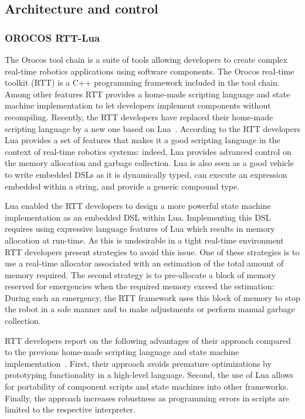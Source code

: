 \subsection{Architecture and control}

\subsubsection{OROCOS RTT-Lua}

The Orocos tool chain is a suite of tools allowing developers to
create complex real-time robotics applications using software
components. The Orocos real-time toolkit (RTT) is a C++ programming
framework included in the tool chain. Among other features RTT
provides a home-made scripting language and state machine
implementation to let developers implement components without
recompiling. Recently, the RTT developers have replaced their
home-made scripting language by a new one based on
Lua~\cite{Klotzbucher:2010fk}. According to the RTT developers Lua
provides a set of features that makes it a good scripting language in
the context of real-time robotics systems: indeed, Lua provides
advanced control on the memory allocation and garbage collection. Lua
is also seen as a good vehicle to write embedded DSLs as it is
dynamically typed, can execute an expression embedded within a string,
and provide a generic compound type.

Lua enabled the RTT developers to design a more powerful state machine
implementation as an embedded DSL within Lua. Implementing this DSL
requires using expressive language features of Lua which results in
memory allocation at run-time. As this is undesirable in a tight
real-time environment RTT developers present strategies to avoid this
issue. One of these strategies is to use a real-time allocator
associated with an estimation of the total amount of memory required.
The second strategy is to pre-allocate a block of memory reserved for
emergencies when the required memory exceed the estimation: During
such an emergency, the RTT framework uses this block of memory to stop
the robot in a safe manner and to make adjustments or perform manual
garbage collection.

RTT developers report on the following advantages of their approach
compared to the previous home-made scripting language and state
machine implementation~\cite{Klotzbucher:2010fk}. First, their
approach avoids premature optimizations by prototyping functionality
in a high-level language. Second, the use of Lua allows for
portability of component scripts and state machines into other
frameworks. Finally, the approach increases robustness as programming
errors in scripts are limited to the respective interpreter.


